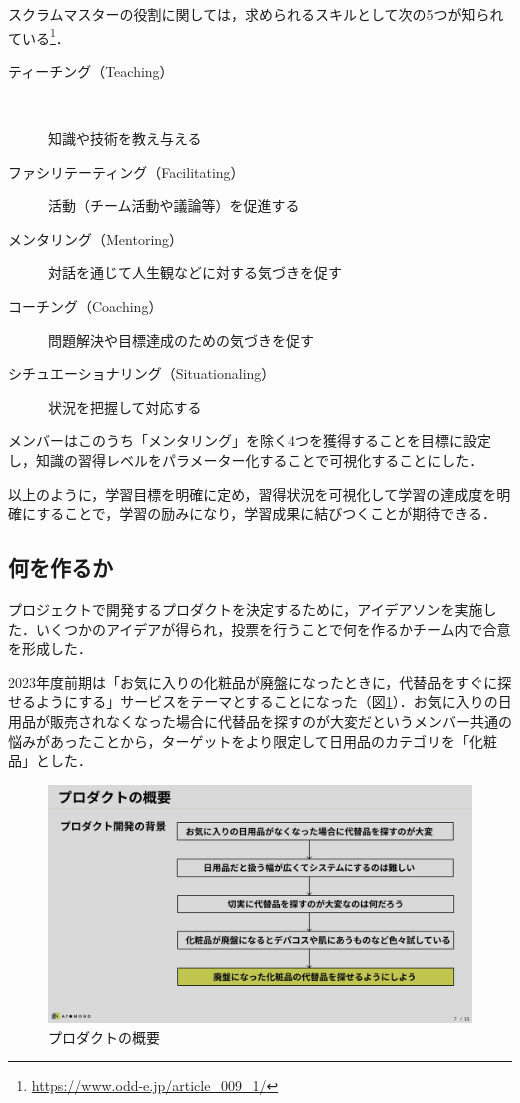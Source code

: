 \documentclass[fontsize=9pt, jafontscale=.95, twocolumn, a4paper]{jlreq}
\begin{document}
スクラムマスターの役割に関しては，求められるスキルとして次の5つが知られている\footnote{\url{https://www.odd-e.jp/article\_009\_1/}}．

\begin{description}
\item[{ティーチング（Teaching）}]　%

知識や技術を教え与える
\item[{ファシリテーティング（Facilitating）}]

活動（チーム活動や議論等）を促進する
\item[{メンタリング（Mentoring）}]

対話を通じて人生観などに対する気づきを促す
\item[{コーチング（Coaching）}]

問題解決や目標達成のための気づきを促す
\item[{シチュエーショナリング（Situationaling）}]

状況を把握して対応する
\end{description}

メンバーはこのうち「メンタリング」を除く4つを獲得することを目標に設定し，知識の習得レベルをパラメーター化することで可視化することにした．

以上のように，学習目標を明確に定め，習得状況を可視化して学習の達成度を明確にすることで，学習の励みになり，学習成果に結びつくことが期待できる．

\subsection{何を作るか}
\label{sec:org0a7ccf8}
プロジェクトで開発するプロダクトを決定するために，アイデアソンを実施した．いくつかのアイデアが得られ，投票を行うことで何を作るかチーム内で合意を形成した．

2023年度前期は「お気に入りの化粧品が廃盤になったときに，代替品をすぐに探せるようにする」サービスをテーマとすることになった（図\ref{fig:プロダクトの概要}）．お気に入りの日用品が販売されなくなった場合に代替品を探すのが大変だというメンバー共通の悩みがあったことから，ターゲットをより限定して日用品のカテゴリを「化粧品」とした．

\begin{figure}[tb]
\centering
\includegraphics[width=.9\linewidth]{./images/前期発表資料_ページ_07.png}
\caption{\label{fig:プロダクトの概要}プロダクトの概要}
\end{figure}
\end{document}

